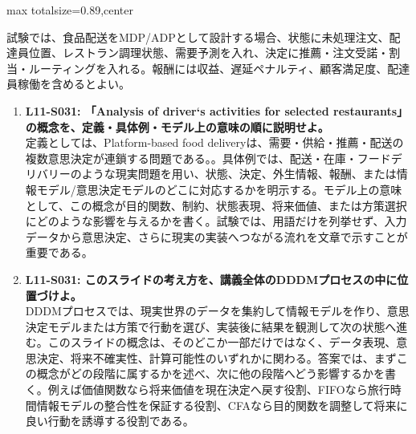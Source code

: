 \begin{minipage}[t]{0.58\textwidth}
\begin{adjustbox}{max totalsize={\textwidth}{0.89\textheight},center}
\begin{minipage}{\textwidth}
試験では、食品配送をMDP/ADPとして設計する場合、状態に未処理注文、配達員位置、レストラン調理状態、需要予測を入れ、決定に推薦・注文受諾・割当・ルーティングを入れる。報酬には収益、遅延ペナルティ、顧客満足度、配達員稼働を含めるとよい。\par{}\begin{enumerate}\item \textbf{L11-S031: 「Analysis of driver‘s activities for selected restaurants」の概念を、定義・具体例・モデル上の意味の順に説明せよ。}\\定義としては、Platform-based food deliveryは、需要・供給・推薦・配送の複数意思決定が連鎖する問題である。。具体例では、配送・在庫・フードデリバリーのような現実問題を用い、状態、決定、外生情報、報酬、または情報モデル/意思決定モデルのどこに対応するかを明示する。モデル上の意味として、この概念が目的関数、制約、状態表現、将来価値、または方策選択にどのような影響を与えるかを書く。試験では、用語だけを列挙せず、入力データから意思決定、さらに現実の実装へつながる流れを文章で示すことが重要である。\item \textbf{L11-S031: このスライドの考え方を、講義全体のDDDMプロセスの中に位置づけよ。}\\DDDMプロセスでは、現実世界のデータを集約して情報モデルを作り、意思決定モデルまたは方策で行動を選び、実装後に結果を観測して次の状態へ進む。このスライドの概念は、そのどこか一部だけではなく、データ表現、意思決定、将来不確実性、計算可能性のいずれかに関わる。答案では、まずこの概念がどの段階に属するかを述べ、次に他の段階へどう影響するかを書く。例えば価値関数なら将来価値を現在決定へ戻す役割、FIFOなら旅行時間情報モデルの整合性を保証する役割、CFAなら目的関数を調整して将来に良い行動を誘導する役割である。\end{enumerate}
\end{minipage}
\end{adjustbox}
\end{minipage}


